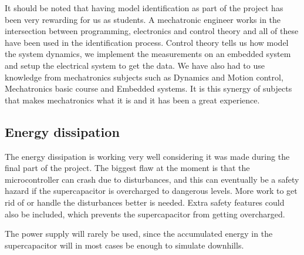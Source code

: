 It should be noted that having model identification as part of the project has
been very rewarding for us as students. A mechatronic engineer works in the
intersection between programming, electronics and control theory and all of
these have been used in the identification process. Control theory tells us how
model the system dynamics, we implement the measurements on an embedded system
and setup the electrical system to get the data. We have also had to use
knowledge from mechatronics subjects such as Dynamics and Motion control,
Mechatronics basic course and Embedded systems. It is this synergy of subjects
that makes mechatronics what it is and it has been a great experience. 

\subsection{Energy dissipation}
The energy dissipation is working very well considering it was made during the final part of the project. The biggest flaw at the moment is that the microcontroller can crash due to disturbances, and this can eventually be a safety hazard if the supercapacitor is overcharged to dangerous levels. More work to get rid of or handle the disturbances better is needed. Extra safety features could also be included, which prevents the supercapacitor from getting overcharged.

The power supply will rarely be used, since the accumulated energy in the supercapacitor will in most cases be enough to simulate downhills.
